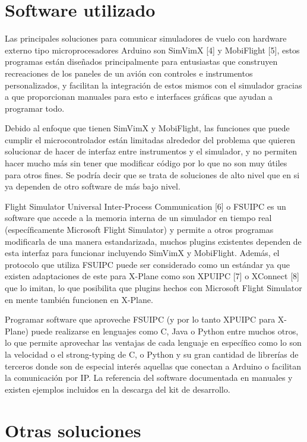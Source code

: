 \documentclass[12pt]{report}
\begin{document}
\section{Software utilizado}

Las principales soluciones para comunicar simuladores de vuelo con hardware externo tipo microprocesadores Arduino son SimVimX [4] y MobiFlight [5], estos programas están diseñados principalmente para entusiastas que construyen recreaciones de los paneles de un avión con controles e instrumentos personalizados, y facilitan la integración de estos mismos con el simulador gracias a que proporcionan manuales para esto e interfaces gráficas que ayudan a programar todo. 

Debido al enfoque que tienen SimVimX y MobiFlight, las funciones que puede cumplir el microcontrolador están limitadas alrededor del problema que quieren solucionar de hacer de interfaz entre instrumentos y el simulador, y no permiten hacer mucho más sin tener que modificar código por lo que no son muy útiles para otros fines. Se podría decir que se trata de soluciones de alto nivel que en si ya dependen de otro software de más bajo nivel.

Flight Simulator Universal Inter-Process Communication [6] o FSUIPC es un software que accede a la memoria interna de un simulador en tiempo real (específicamente Microsoft Flight Simulator) y permite a otros programas modificarla de una manera estandarizada, muchos plugins existentes dependen de esta interfaz para funcionar incluyendo SimVimX y MobiFlight. Además, el protocolo que utiliza FSUIPC puede ser considerado como un estándar ya que existen adaptaciones de este para X-Plane como son XPUIPC [7] o XConnect [8] que lo imitan, lo que posibilita que plugins hechos con Microsoft Flight Simulator en mente también funcionen en X-Plane.

Programar software que aproveche FSUIPC (y por lo tanto XPUIPC para X-Plane) puede realizarse en lenguajes como C, Java o Python entre muchos otros, lo que permite aprovechar las ventajas de cada lenguaje en específico como lo son la velocidad o el strong-typing de C, o Python y su gran cantidad de librerías de terceros donde son de especial interés aquellas que conectan a Arduino o facilitan la comunicación por IP. La referencia del software documentada en manuales y existen ejemplos incluidos en la descarga del kit de desarrollo.

\section{Otras soluciones}
\end{document}
